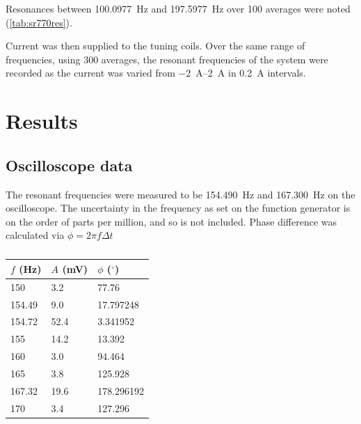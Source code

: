 \documentclass{article}
\begin{document}
Resonances between \qty{100.0977}{Hz} and \qty{197.5977}{Hz} over 100 averages were noted (\autoref{tab:sr770res}).

Current was then supplied to the tuning coils. Over the same range of frequencies, using 300 averages, the resonant frequencies of the system were recorded as the current was varied from \qtyrange{-2}{2}{\ampere} in \qty{0.2}{\ampere} intervals.

\section{Results}

\subsection{Oscilloscope data}
The resonant frequencies were measured to be \qty{154.490}{Hz} and \qty{167.300}{Hz} on the oscilloscope. The uncertainty in the frequency as set on the function generator is on the order of parts per million, and so is not included.
Phase difference was calculated via $\phi = 2\pi f \Delta t$

\begin{table}
	\centering
  \begin{tabular}{@{}lll@{}}
    \toprule
    $f$ (\unit{Hz}) & $A$ (\unit{\mV}) & $\phi$ ($^\circ$) \\ \midrule
    150    & 3.2      & 77.76      \\
    154.49 & 9.0      & 17.797248  \\
    154.72 & 52.4     & 3.341952   \\
    155    & 14.2     & 13.392     \\
    160    & 3.0      & 94.464     \\
    165    & 3.8      & 125.928    \\
    167.32 & 19.6     & 178.296192 \\
    170    & 3.4      & 127.296    \\ \bottomrule
  \end{tabular}
  \caption{}
  \label{tab:oscfa}
\end{table}
\end{document}
